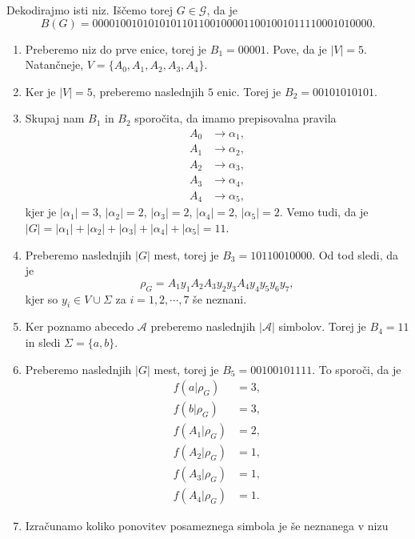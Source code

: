 \documentclass[fin1, tisk]{fmfdelo}
\providecommand{\abs}[1]{\left\lvert #1 \right\rvert}
\newcommand{\A}{\mathcal{A}}
\newcommand{\G}{\mathcal{G}}
\theoremstyle{definition}
\begin{document}
\begin{primer}
    Dekodirajmo isti niz. Iščemo torej $G \in \G$, da je
    \[
        B(G) = 00001 00101010101 10110010000 11 00100101111 0001010000.
    \]
    \begin{enumerate}
        \item Preberemo niz do prve enice, torej je $B_1 = 00001$. Pove, da je $\abs{V} = 5 $.
        Natančneje, $V = \{ A_0, A_1, A_2, A_3, A_4\}$.
        \item Ker je $\abs{V} = 5$, preberemo naslednjih $5$ enic. Torej je $B_2 = 00101010101$.
        \item Skupaj nam $B_1$ in $B_2$ sporočita, da imamo prepisovalna pravila
        \begin{align*}
            A_0 &\rightarrow \alpha_1, \\
            A_1 &\rightarrow \alpha_2, \\
            A_2 &\rightarrow \alpha_3, \\
            A_3 &\rightarrow \alpha_4, \\
            A_4 &\rightarrow \alpha_5,
        \end{align*}
        kjer je $\abs{\alpha_1} = 3$, $\abs{\alpha_2} = 2$, $\abs{\alpha_3} = 2$,
        $\abs{\alpha_4} = 2$, $\abs{\alpha_5} = 2$. Vemo tudi, da je 
        $\abs{G} = \abs{\alpha_1} + \abs{\alpha_2} + \abs{\alpha_3} + \abs{\alpha_4} + \abs{\alpha_5} = 11$.
        \item Preberemo naslednjih $\abs{G}$ mest, torej je $B_3 = 10110010000$.
        Od tod sledi, da je 
        \[
            \rho_G = A_1y_1A_2A_3y_2y_3A_4y_4y_5y_6y_7,
        \]
        kjer so $y_i \in V \cup \Sigma$ za $i = 1,2, \cdots, 7$ še neznani.
        \item Ker poznamo abecedo $\A$ preberemo naslednjih $\abs{\A}$ simbolov. Torej je $B_4 = 11$
        in sledi $\Sigma = \{ a,b \}$.
        \item Preberemo naslednjih $\abs{G}$ mest, torej je $B_5 = 00100101111$. To sporoči,
        da je
        \begin{align*}
            f(a|\rho_G) &= 3,\\
            f(b|\rho_G) &= 3,\\
            f(A_1|\rho_G) &= 2,\\
            f(A_2|\rho_G) &= 1,\\
            f(A_3|\rho_G) &= 1,\\
            f(A_4|\rho_G) &= 1.
        \end{align*}
        \item Izračunamo koliko ponovitev posameznega simbola je še neznanega v nizu

\end{enumerate}
\end{primer}
\end{document}
